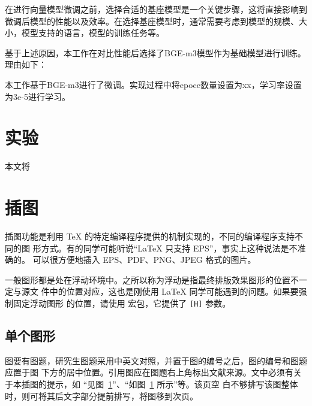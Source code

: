 在进行向量模型微调之前，选择合适的基座模型是一个关键步骤，这将直接影响到微调后模型的性能以及效率。在选择基座模型时，通常需要考虑到模型的规模、大小，模型支持的语言，模型的训练任务等。

基于上述原因，本工作在对比性能后选择了BGE-m3模型作为基础模型进行训练。理由如下：

本工作基于BGE-m3进行了微调。实现过程中将epoce数量设置为xx，学习率设置为3e-5进行学习。

\section{实验}

本文将

\section{插图}

插图功能是利用 \TeX{} 的特定编译程序提供的机制实现的，不同的编译程序支持不同的图
形方式。有的同学可能听说“\LaTeX{} 只支持 EPS”，事实上这种说法是不准确的。\XeTeX{}
可以很方便地插入 EPS、PDF、PNG、JPEG 格式的图片。

一般图形都是处在浮动环境中。之所以称为浮动是指最终排版效果图形的位置不一定与源文
件中的位置对应，这也是刚使用 \LaTeX{} 同学可能遇到的问题。如果要强制固定浮动图形
的位置，请使用  宏包，它提供了 \texttt{[H]} 参数。

\subsection{单个图形}

图要有图题，研究生图题采用中英文对照，并置于图的编号之后，图的编号和图题应置于图
下方的居中位置。引用图应在图题右上角标出文献来源。文中必须有关于本插图的提示，如
“见图~\ref{fig:energy-distrib}”、“如图~\ref{fig:energy-distrib} 所示”等。该页空
白不够排写该图整体时，则可将其后文字部分提前排写，将图移到次页。

\begin{figure}[!htp]
  \centering
  \label{fig:energy-distrib}
\end{figure}

